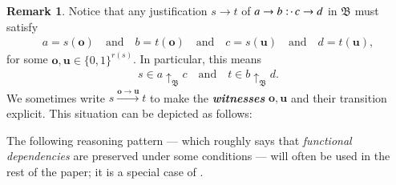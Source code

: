 \documentclass[11pt]{amsart}
\theoremstyle{definition} %
\newtheorem{remark}[theorem]{Remark}
\newcommand{\righttherefore}{:\joinrel\cdot\,}
\begin{document}
\begin{remark}\label{r:abcd} Notice that any justification $s\to t$ of $a\to b\righttherefore c\to d$ in $\mathfrak B$ must satisfy
\begin{align}\label{equ:varphi_psi} 
	a=s(\mathbf o) \quad\text{and}\quad b=t(\mathbf o) \quad\text{and}\quad c=s(\mathbf u) \quad\text{and}\quad d= t(\mathbf u),
\end{align} for some $\mathbf o, \mathbf u\in\{0,1\}^{r(s)}$. In particular, this means
\begin{align*}  
	s\in a\uparrow_\mathfrak B c \quad\text{and}\quad  t\in b\uparrow_\mathfrak B d.
\end{align*} We sometimes write $s\xrightarrow{\mathbf o\to\mathbf u} t$ to make the \textit{\textbf{witnesses}} $\mathbf o,\mathbf u$ and their transition explicit. This situation can be depicted as follows:
\begin{center}
\end{center} 

\end{remark}

The following reasoning pattern --- which roughly says that \textit{functional dependencies} are preserved under some conditions --- will often be used in the rest of the paper; it is a special case of .
\end{document}
